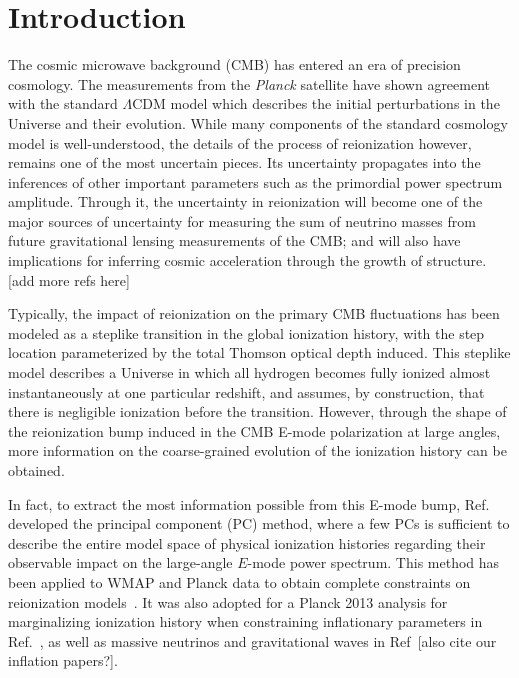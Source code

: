 \documentclass[prd,twocolumn,amsmath,amssymb,floatfix,superscriptaddress,nofootinbib]{revtex4-1}
\begin{document}
\maketitle




\section{Introduction}
\label{sec:intro}

The cosmic microwave background (CMB) has entered an era of precision cosmology. The measurements from the \textit{Planck} satellite have shown agreement with the standard $\Lambda$CDM model which describes the initial perturbations in the Universe and their evolution. While many components of the standard cosmology model is well-understood, the details of the process of reionization however, remains one of the most uncertain pieces. Its uncertainty propagates into the inferences of other important parameters such as the primordial power spectrum amplitude. Through it, the uncertainty in reionization will become one of the major sources of uncertainty for measuring the sum of neutrino masses from future gravitational lensing measurements of the CMB; and will also have implications for inferring cosmic acceleration through the growth of structure. [add more refs here]

Typically, the impact of reionization on the primary CMB fluctuations has been modeled as a steplike transition in the global ionization history, with the step location parameterized by the total Thomson optical depth induced. This steplike model describes a Universe in which all hydrogen becomes fully ionized almost instantaneously at one particular redshift, and assumes, by construction, that there is negligible ionization before the transition. However, through the shape of the reionization bump induced in the CMB E-mode polarization at large angles, more information on the coarse-grained evolution of the ionization history can be obtained. 

In fact, to extract the most information possible from this E-mode bump, Ref.~\cite{Hu:2003gh, Mortonson:2007hq} developed the principal component (PC) method, where a few PCs is sufficient to describe the entire model space of physical ionization histories regarding their observable impact on the large-angle $E$-mode power spectrum. This method has been applied to WMAP and Planck data to obtain complete constraints on reionization models~\cite{Mortonson:2008rx, Mortonson:2007hq, Heinrich:2016ojb, Aghanim:2018eyx}. It was also adopted for a Planck 2013 analysis for marginalizing ionization history when constraining inflationary parameters in Ref.~\cite{Planck:2013jfk}, as well as massive neutrinos and gravitational waves in Ref~\cite{Dai:2015dwa}[also cite our inflation papers?]. 
\end{document}
